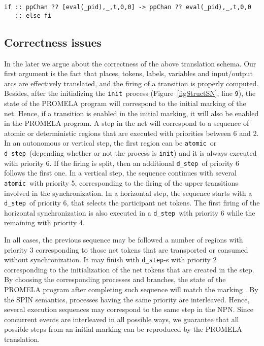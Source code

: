 \documentclass{llncs}
\begin{document}
\small
\begin{verbatim}
if :: ppChan ?? [eval(_pid),_,t,0,0] -> ppChan ?? eval(_pid),_,t,0,0
   :: else fi
\end{verbatim}
\nfont




\subsection{Correctness issues}

In the later we argue about the correctness of the above translation schema. Our first argument is the fact that places, tokens, labels, variables and input/output arcs are effectively translated, and the firing of a transition is properly computed. Besides, after the initializing the \small\verb"init"\nfont\  process (Figure~\ref{figStructSN}, line \small\verb"9"\nfont), the state of the PROMELA program will correspond to the initial marking of the net.  Hence, if a transition is enabled in the initial marking, it will also be enabled in the PROMELA program.  A step  in the net will correspond to a sequence of atomic or deterministic regions that are executed with priorities between 6 and 2. In an autonomous or vertical step, the first region can be \small\verb"atomic"\nfont\  or \small\verb"d_step"\nfont\ (depending whether or not the process is \small\verb"init"\nfont) and it is always executed with priority 6. If the firing is split, then an additional \small\verb"d_step"\nfont\   of priority 6 follows the first one. In a vertical step, the sequence continues with several \small\verb"atomic"\nfont\  with priority 5, corresponding to the firing of the upper transitions involved in the synchronization. In a horizontal step, the sequence starts with a \small\verb"d_step"\nfont\  of priority 6, that selects the participant net tokens. The first firing of the horizontal synchronization is also executed in a \small\verb"d_step"\nfont\   with priority 6 while the remaining with priority 4.

In all cases, the previous sequence may be followed a number of regions with priority 3 corresponding to those net tokens that are transported or consumed without synchronization. It may finish with \small\verb"d_step"\nfont-s  with priority 2 corresponding to the initialization of the net tokens that are created in the step. By choosing the corresponding processes and branches, the state of the PROMELA program after completing such sequence will match the marking . By the SPIN  semantics, processes having the same priority are interleaved. Hence, several execution sequences may correspond to the same step in the NPN. Since concurrent events are interleaved in all possible ways, we guarantee that all possible steps from an initial marking can be reproduced by the PROMELA translation.
\end{document}
